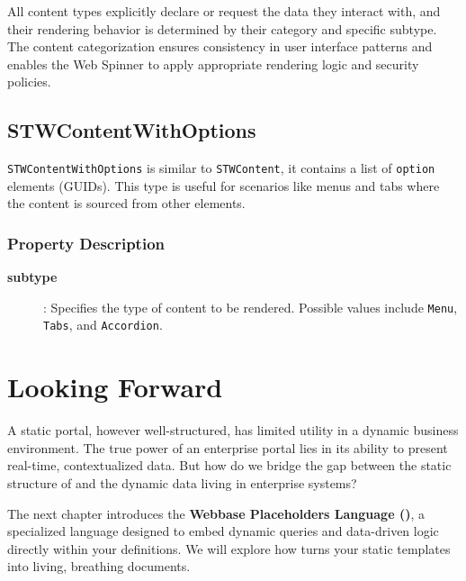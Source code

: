 All content types explicitly declare or request the data they interact with, and their rendering behavior is determined by their category and specific subtype. The content categorization ensures consistency in user interface patterns and enables the Web Spinner to apply appropriate rendering logic and security policies.

\subsection{STWContentWithOptions}

\texttt{STWContentWithOptions} is similar to \texttt{STWContent}, it contains a list of \texttt{option} elements (GUIDs). This type is useful for scenarios like menus and tabs where the content is sourced from other elements.

\subsubsection{Property Description}

\begin{description}
\item[\textbf{subtype}]: Specifies the type of content to be rendered. Possible values include \texttt{Menu}, \texttt{Tabs}, and \texttt{Accordion}.
\end{description}

\section{Looking Forward}
\label{sec:wbdl-forward}

A static portal, however well-structured, has limited utility in a dynamic business environment. The true power of an enterprise portal lies in its ability to present real-time, contextualized data. But how do we bridge the gap between the static structure of \wbdl{} and the dynamic data living in enterprise systems?

The next chapter introduces the \textbf{Webbase Placeholders Language (\wbpl{})}, a specialized language designed to embed dynamic queries and data-driven logic directly within your \wbdl{} definitions. We will explore how \wbpl{} turns your static templates into living, breathing documents.
